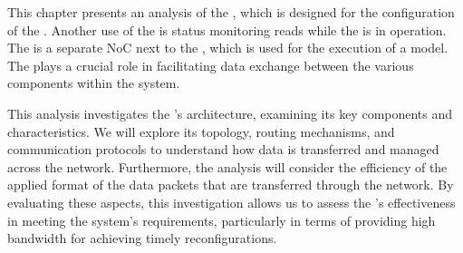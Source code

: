 This chapter presents an analysis of the \confignoc{}, which is designed for the configuration of the \graicore{}.
Another use of the \confignoc{} is status monitoring reads while the \graicore{} is in operation.
The \confignoc{} is a separate NoC next to the \eventnoc{}, which is used for the execution of a model.
The \confignoc{} plays a crucial role in facilitating data exchange between the various components within the system.

This analysis investigates the \confignoc{}'s architecture, examining its key components and characteristics.
We will explore its topology, routing mechanisms, and communication protocols to understand how data is transferred and managed across the network.
Furthermore, the analysis will consider the efficiency of the applied format of the data packets that are transferred through the network.  
By evaluating these aspects, this investigation allows us to assess the \confignoc{}'s effectiveness in meeting the system's requirements, particularly in terms of providing high bandwidth for achieving timely reconfigurations.
